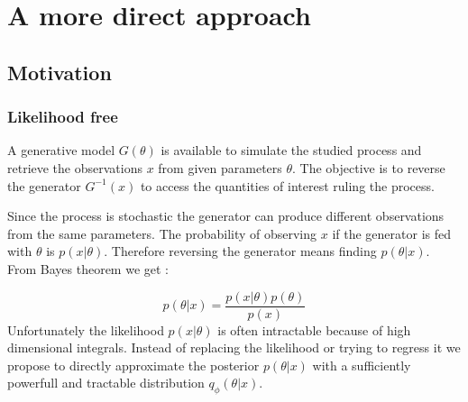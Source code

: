 
\chapter{A more direct approach}
\label{chap:direct_approach}

\ifpdf
    \graphicspath{{Chapter3/Figs/Raster/}{Chapter3/Figs/PDF/}{Chapter3/Figs/}}
\else
    \graphicspath{{Chapter3/Figs/Vector/}{Chapter3/Figs/}}
\fi






\section{Motivation} %
\label{sec:motivation}



\subsection{Likelihood free} %
\label{sub:likelihood_free}


A generative model $G(\theta)$ is available to simulate the studied process and retrieve the observations $x$ from given parameters $\theta$.
The objective is to reverse the generator $G^{-1}(x)$ to access the quantities of interest ruling the process.

Since the process is stochastic the generator can produce different observations from the same parameters.
The probability of observing $x$ if the generator is fed with $\theta$ is $p(x | \theta)$.
Therefore reversing the generator means finding $p(\theta | x)$.
From Bayes theorem we get :

\begin{equation}
    p(\theta | x) = \frac{p(x | \theta) p(\theta) }{p(x)}
\end{equation}
Unfortunately the likelihood $p(x | \theta)$ is often intractable because of high dimensional integrals.
Instead of replacing the likelihood or trying to regress it we propose to directly approximate the posterior $p(\theta | x)$ with a sufficiently powerfull and tractable distribution $q_\phi(\theta | x)$.



